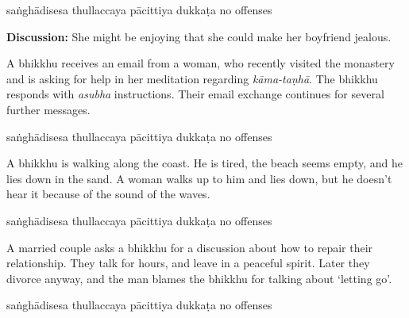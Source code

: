 \begin{exam}{\autoExamName}
\begin{problem*}
\begin{parts}
  \begin{answers}{5}
    \bChoices
     saṅghādisesa\eAns
     thullaccaya\eAns
     pācittiya\eAns
     dukkaṭa\eAns
     no offenses\eAns
    \eChoices
  \end{answers}

  \bigskip

  \textbf{Discussion:} She might be enjoying that she could make her boyfriend jealous.

  \bigskip

\item A bhikkhu receives an email from a woman, who recently visited the
  monastery and is asking for help in her meditation regarding \textit{kāma-taṇhā}.
  The bhikkhu responds with \textit{asubha} instructions. Their email exchange
  continues for several further messages.

  \bigskip

  \begin{answers}{5}
    \bChoices
     saṅghādisesa\eAns
     thullaccaya\eAns
     pācittiya\eAns
     dukkaṭa\eAns
     no offenses\eAns
    \eChoices
  \end{answers}
  
  \bigskip

\item A bhikkhu is walking along the coast. He is tired, the beach seems empty,
  and he lies down in the sand. A woman walks up to him and lies down, but he
  doesn't hear it because of the sound of the waves.

  \bigskip

  \begin{answers}{5}
    \bChoices
     saṅghādisesa\eAns
     thullaccaya\eAns
     pācittiya\eAns
     dukkaṭa\eAns
     no offenses\eAns
    \eChoices
  \end{answers}

  \bigskip

\item A married couple asks a bhikkhu for a discussion about how to repair their
  relationship. They talk for hours, and leave in a peaceful spirit. Later they
  divorce anyway, and the man blames the bhikkhu for talking about `letting go'.

  \bigskip

  \begin{answers}{5}
    \bChoices
     saṅghādisesa\eAns
     thullaccaya\eAns
     pācittiya\eAns
     dukkaṭa\eAns
     no offenses\eAns
    \eChoices
  \end{answers}


\end{parts}
\end{problem*}
\end{exam}
